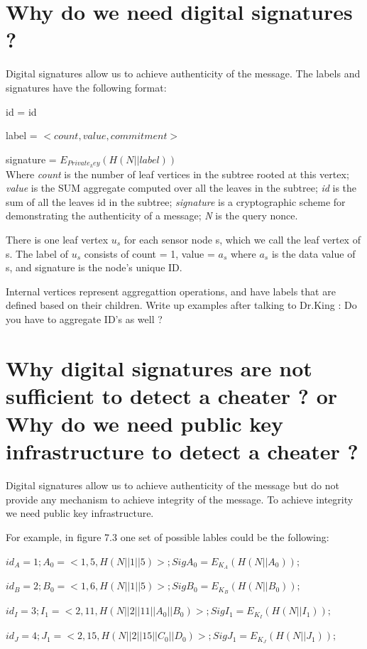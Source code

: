 	\section{ Why do we need digital signatures ?}
	Digital signatures allow us to achieve authenticity of the message. 
	The labels and signatures have the following format:

	id = id

	label = $<count, value, commitment>$

	signature = $E_{Private_key}( H( N || label ) )$\\
	Where \textit{count} is the number of leaf vertices in the subtree rooted at this vertex; 
	\textit{value} is the SUM aggregate computed over all the leaves in the subtree; \textit{id} is the sum of all the leaves id in the subtree; \textit{signature} is a cryptographic scheme for demonstrating the authenticity of a message; \textit{N} is the query nonce. 
	
	There is one leaf vertex $u_{s}$ for each sensor node s, which we call the leaf vertex of s. The label of $u_{s}$ consists of count = 1, value = $a_{s}$ where $a_{s}$ is the data value of s, and signature is the node's unique ID.

	Internal vertices represent aggregattion operations, and have labels that are defined based on their children. Write up examples after talking to Dr.King : Do you have to aggregate ID's as well ?

	\section{ Why digital signatures are not sufficient to detect a cheater ? or Why do we need public key infrastructure to detect a cheater ?}
	Digital signatures allow us to achieve authenticity of the message but do not provide any mechanism to achieve integrity of the message. To achieve integrity we need public key infrastructure. 

	For example, in figure 7.3 one set of possible lables could be the following:

	$id_{A} = 1; A_{0} = <1, 5, H(N||1||5)>; Sig A_{0} = E_{K_{A}}(H(N||A_{0})); $

	$id_{B} = 2; B_{0} = <1, 6, H(N||1||5)>; Sig B_{0} = E_{K_{B}}(H(N||B_{0})); $

	$id_{I} = 3; I_{1} = <2, 11, H(N||2||11||A_{0}||B_{0})>; Sig I_{1} = E_{K_{I}}(H(N||I_{1})); $

	$id_{J} = 4; J_{1} = <2, 15, H(N||2||15||C_{0}||D_{0})>; Sig J_{1} = E_{K_{J}}(H(N||J_{1})); $

